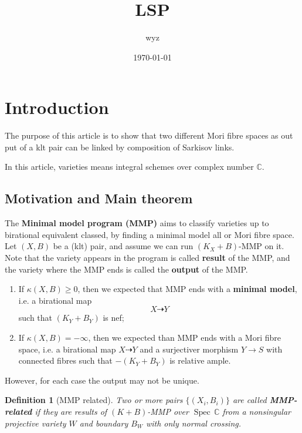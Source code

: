 \documentclass{article}
\title{LSP}
\author{wyz}
\date{\today}
\newtheorem{defn}{Definition}[subsection]
\begin{document}
\section{Introduction}
The purpose of this article is to show that two different Mori fibre spaces as out put of a klt pair can be linked by composition of  Sarkisov links.




In this article, varieties means integral schemes over complex number $\mathbb{C}$.
\subsection{Motivation and Main theorem}
The \textbf{Minimal model program (MMP)}  aims to classify varieties up to birational equivalent classed, by finding a minimal model all or Mori fibre space. Let $ \left(X,B\right) $ be a (klt) pair, and assume we can run $ (K_X+B)$-MMP on it. Note that the variety appears in the program is called \textbf{result} of the MMP, and the variety where the MMP ends is called the \textbf{output} of the MMP.
\begin{enumerate}
  \item If $\kappa(X,B)\geqslant 0$, then we expected that MMP ends with a \textbf{minimal model}, i.e. a birational map 
    \[
    X \dashrightarrow Y
    \]
    such that $(K_Y+B_Y)$ is nef;
  \item If $\kappa(X,B)= -\infty$, then we expected than MMP ends with a Mori fibre space, i.e. a birational map $X \dashrightarrow Y$ and a surjectiver morphism $Y\to S$ with connected fibres such that $-(K_Y+B_Y)$ is relative ample.
\end{enumerate}
However, for each case the output may not be unique.
\begin{defn}[MMP related]
  Two or more pairs $ \{(X_i,B_i)\} $ are called \textbf{MMP-related} if they are results of $ (K+B) $-MMP over $ \operatorname{Spec}\,\mathbb{C} $ from a nonsingular  projective variety $ W $ and  boundary $ B_W $ with only normal crossing.
\end{defn}
\end{document}
